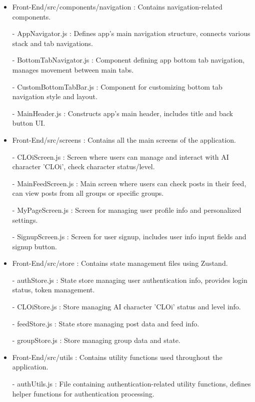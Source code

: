\documentclass[conference]{IEEEtran}
\begin{document}
\begin{itemize}
                    \item Front-End/src/components/navigation : Contains navigation-related components.
                        \item[-] AppNavigator.js : Defines app's main navigation structure, connects various stack and tab navigations.
                        \item[-] BottomTabNavigator.js : Component defining app bottom tab navigation, manages movement between main tabs.
                        \item[-] CustomBottomTabBar.js : Component for customizing bottom tab navigation style and layout.
                        \item[-] MainHeader.js : Constructs app's main header, includes title and back button UI.
                    \vspace{3mm}
                    
                    \item Front-End/src/screens : Contains all the main screens of the application.
                        \item[-] CLOiScreen.js : Screen where users can manage and interact with AI character 'CLOi', check character status/level.
                        \item[-] MainFeedScreen.js : Main screen where users can check posts in their feed, can view posts from all groups or specific groups.
                        \item[-] MyPageScreen.js : Screen for managing user profile info and personalized settings.
                        \item[-] SignupScreen.js : Screen for user signup, includes user info input fields and signup button.
                    \vspace{3mm}
                    
                    \item Front-End/src/store : Contains state management files using Zustand.
                        \item[-] authStore.js : State store managing user authentication info, provides login status, token management.
                        \item[-] CLOiStore.js : Store managing AI character 'CLOi' status and level info.
                        \item[-] feedStore.js : State store managing post data and feed info.
                        \item[-] groupStore.js : Store managing group data and state.
                    \vspace{3mm}
                    
                    \item Front-End/src/utils : Contains utility functions used throughout the application.
                        \item[-] authUtils.js : File containing authentication-related utility functions, defines helper functions for authentication processing.
                \end{itemize}    
        
\end{document}
